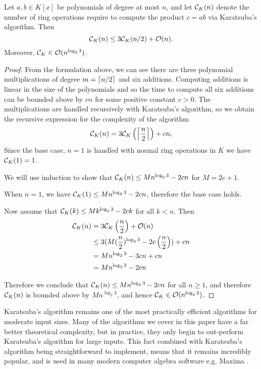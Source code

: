 \begin{theorem}

    Let $a, b \in K[x]$ be polynomials of degree at most $n$, and let $\mathcal C_K(n)$ denote the number of ring operations require to compute the product $c = ab$ via Karatsuba's algorithm. Then
    \[
        \mathcal C_K(n) \le 3\mathcal C_K(n/2) + \mathcal O(n).
    \]
    Moreover, $\mathcal C_K \in \mathcal O(n^{\log_2 3})$.
\end{theorem}

\begin{proof}
    From the formulation above, we can see there are three polynomial multiplications of degree $m = \left \lceil n/2 \right \rceil$ and six additions. Computing additions is linear in the size of the polynomials and so the time to compute all six additions can be bounded above by $cn$ for some positive constant $c > 0$. The multiplications are handled recursively with Karatsuba's algorithm, so we obtain the recursive expression for the complexity of the algorithm
    \[
        \mathcal C_K(n) = 3\mathcal C_K\left(\left \lceil \frac{n}{2} \right \rceil\right) + cn,
    \]
    Since the base case, $n = 1$ is handled with normal ring operations in $K$ we have $\mathcal C_K(1) = 1$.

    We will use induction to show that $\mathcal C_K(n) \le Mn^{\log_2 3} - 2cn$ for $M = 2c + 1$.

    When $n = 1$, we have $\mathcal C_K(1) \le Mn^{\log_2 3} - 2cn$, therefore the base case holds.

    Now assume that $\mathcal C_K(k) \le Mk^{\log_2 3} - 2ck$ for all $k < n$. Then
    \begin{align*}
        \mathcal C_K(n) &= 3\mathcal C_K\left(\frac{n}{2}\right) + \mathcal O(n)\\
                   &\le 3(M(\frac{n}{2})^{\log_2 3} - 2c\left(\frac{n}{2}\right)) + cn\\
                   &= Mn^{\log_2 3} - 3cn + cn\\
                   &= Mn^{\log_2 3} - 2cn
    \end{align*}

    Therefore we conclude that $\mathcal C_K(n) \le Mn^{\log_2 3} - 2cn$ for all $n \ge 1$, and therefore $\mathcal C_K(n)$ is bounded above by $Mn^{\log_2 3}$, and hence $\mathcal C_K \in \mathcal O(n^{\log_2 3})$.
\end{proof}

\medskip

Karatsuba's algorithm remains one of the most practically efficient algorithms for moderate input sizes. Many of the algorithms we cover in this paper have a far better theoretical complexity, but in practice, they only begin to out-perform Karatsuba's algorithm for large inputs. This fact combined with Karatsuba's algorithm being straightforward to implement, means that it remains incredibly popular, and is used in many modern computer algebra software e.g. Maxima \cite{maxima-karatsuba}.

